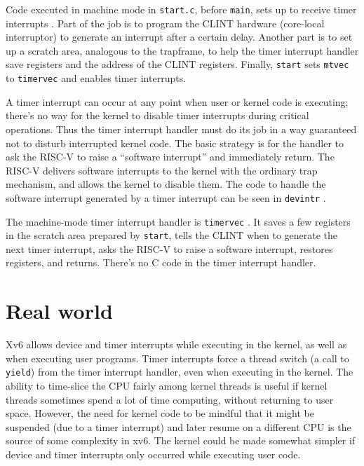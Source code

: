 Code executed in machine mode in {\tt start.c}, before {\tt main},
sets up to receive timer interrupts
.
Part of the job is to program the CLINT hardware (core-local interruptor)
to generate an interrupt after a certain delay.
Another part is to set up a scratch area, analogous to the trapframe,
to help
the timer interrupt handler save registers and 
the address of the CLINT registers.
Finally, {\tt start} sets {\tt mtvec} to {\tt timervec} and
enables timer interrupts.

A timer interrupt can occur at any point when user or kernel code is
executing; there's no way for the kernel to disable timer interrupts
during critical operations. Thus the timer interrupt handler must do
its job in a way guaranteed not to disturb interrupted kernel code.
The basic strategy is for the handler to ask the RISC-V to
raise a ``software interrupt'' and immediately return. The RISC-V
delivers software interrupts to the kernel with the ordinary trap
mechanism, and allows the kernel to disable them. The code to
handle the software interrupt generated by a timer interrupt can be
seen in {\tt devintr} .

The machine-mode timer interrupt handler is {\tt timervec} 
.
It saves a few registers in the scratch area prepared by {\tt start},
tells the CLINT when to generate the next timer interrupt,
asks the RISC-V to raise a software interrupt,
restores registers, and returns.
There's no C code in the timer interrupt handler.

\section{Real world}

Xv6 allows device and timer interrupts while executing in the kernel,
as well as when executing user programs. Timer interrupts force a
thread switch (a call to {\tt yield}) from the timer interrupt
handler, even when executing in the kernel. The ability to time-slice
the CPU fairly among kernel threads is useful if kernel threads
sometimes spend a lot of time computing, without returning to user
space. However, the need for kernel code to be mindful that it might
be suspended (due to a timer interrupt) and later resume on a
different CPU is the source of some complexity in xv6. The kernel
could be made somewhat simpler if device and timer interrupts only
occurred while executing user code.

